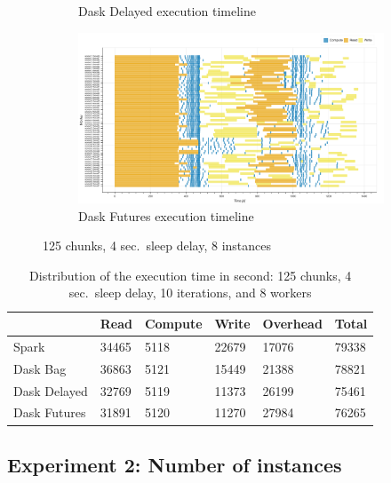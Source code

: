 \documentclass[conference]{IEEEtran}
\begin{document}
\begin{figure}[!htb]
\begin{subfigure}[b]{\columnwidth}
        \caption{Dask Delayed execution timeline}\label{fig:inc_dask_delayed_gantt}
    \end{subfigure}
    \hfill
    \begin{subfigure}[b]{\columnwidth}
        \includegraphics[clip,width=\columnwidth]{images/Dask_futures_inc_baseline_gantt.png}%
        \caption{Dask Futures execution timeline}\label{fig:inc_dask_futures_gantt}
    \end{subfigure}
    \caption{125 chunks, 4 sec.\ sleep delay, 8 instances}
\end{figure}

\begin{table}[!b]
    \renewcommand{\arraystretch}{1.3}
    \caption{Distribution of the execution time in second: 125 chunks, 4 sec.\ sleep
    delay, 10 iterations, and 8 workers}\label{tab:inc_base}
    \centering
    \begin{tabular*}{\columnwidth}{llllll}
    \hline
                 & Read  & Compute & Write & Overhead & Total \\ \hline
    Spark        & 34465 & 5118    & 22679 & 17076    & 79338 \\
    Dask Bag     & 36863 & 5121    & 15449 & 21388    & 78821 \\
    Dask Delayed & 32769 & 5119    & 11373 & 26199    & 75461 \\
    Dask Futures & 31891 & 5120    & 11270 & 27984    & 76265 \\ \hline
    \end{tabular*}
 \end{table}

\subsection{Experiment 2: Number of instances}
\end{document}
